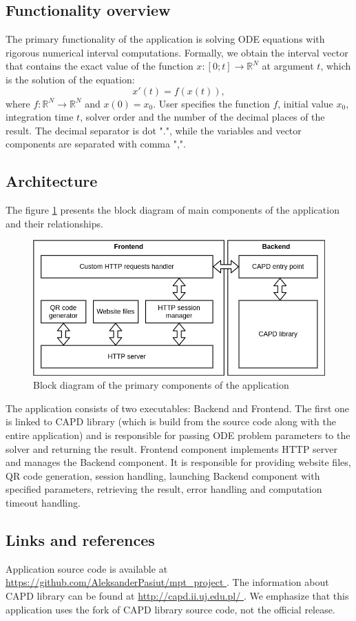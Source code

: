\documentclass[12pt, a4paper]{article}
\begin{document}
\subsection*{Functionality overview}
The primary functionality of the application is solving ODE equations with rigorous numerical interval computations. Formally, we obtain the interval vector that contains the exact value of the function $x : [0;t] \to \mathbb{R}^N$ at argument $t$, which is the solution of the equation:
\[
    x'(t) = f \left( x(t) \right),
\]
where $f : \mathbb{R}^N \to \mathbb{R}^N$ and $x(0) = x_0$. User specifies the function $f$, initial value $x_0$, integration time $t$, solver order and the number of the decimal places of the result. The decimal separator is dot ".", while the variables and vector components are separated with comma ",".

\subsection*{Architecture}
The figure \ref{fig:architecture} presents the block diagram of main components of the application and their relationships.

\begin{figure}[h]
    \includegraphics[width=\textwidth]{architecture.png}
    \caption{Block diagram of the primary components of the application}
    \label{fig:architecture}
\end{figure}

The application consists of two executables: Backend and Frontend. The first one is linked to CAPD library (which is build from the source code along with the entire application) and is responsible for passing ODE problem parameters to the solver and returning the result. Frontend component implements HTTP server and manages the Backend component. It is responsible for providing website files, QR code generation, session handling, launching Backend component with specified parameters, retrieving the result, error handling and computation timeout handling.

\subsection*{Links and references}
Application source code is available at \url{ https://github.com/AleksanderPasiut/mpt_project }. The information about CAPD library can be found at \url{ http://capd.ii.uj.edu.pl/ }. We emphasize that this application uses the fork of CAPD library source code, not the official release.
\end{document}
